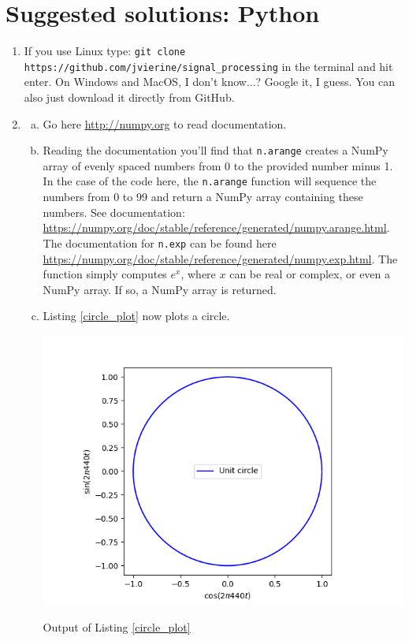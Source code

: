 \newpage
\section{Suggested solutions: Python}


\begin{enumerate}
\item If you use Linux type: \verb|git clone https://github.com/jvierine/signal_processing| in the terminal and hit enter.
On Windows and MacOS, I don't know...? Google it, I guess. You can also just download it directly from GitHub.

\item 
\begin{enumerate}[a)]
\item Go here \url{http://numpy.org} to read documentation. 
\item Reading the documentation you'll find that \verb|n.arange| creates a NumPy array 
      of evenly spaced numbers from 0 to the provided number minus 1. In the case of the code here, 
      the \verb|n.arange| function will sequence the numbers from 0 to 99 and return a NumPy array containing these numbers. 
      See documentation: \url{https://numpy.org/doc/stable/reference/generated/numpy.arange.html}.
      The documentation for \verb|n.exp| can be found here \url{https://numpy.org/doc/stable/reference/generated/numpy.exp.html}.
      The function simply computes $e^{x}$, where $x$ can be real or complex, or even a NumPy array. If so, a NumPy array is returned. 
\item Listing \ref{circle_plot} now plots a circle. 


\begin{marginfigure}
\includegraphics[width=\textwidth]{ch02/figures/circle_plot.png}
\caption{Output of Listing \ref{circle_plot}}
\end{marginfigure}


\end{enumerate}
\end{enumerate}
